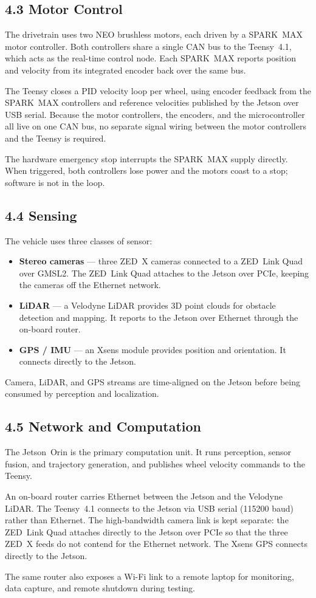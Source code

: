 \documentclass[11pt]{article}
\begin{document}
\subsection*{4.3 Motor Control}
The drivetrain uses two NEO brushless motors, each driven by a SPARK~MAX
motor controller. Both controllers share a single CAN bus to the Teensy~4.1,
which acts as the real-time control node. Each SPARK~MAX reports position
and velocity from its integrated encoder back over the same bus.

The Teensy closes a PID velocity loop per wheel, using encoder feedback from
the SPARK~MAX controllers and reference velocities published by the Jetson
over USB serial. Because the motor controllers, the encoders, and the
microcontroller all live on one CAN bus, no separate signal wiring between
the motor controllers and the Teensy is required.

The hardware emergency stop interrupts the SPARK~MAX supply directly. When
triggered, both controllers lose power and the motors coast to a stop;
software is not in the loop.

\subsection*{4.4 Sensing}
The vehicle uses three classes of sensor:

\begin{itemize}
  \item \textbf{Stereo cameras} — three ZED~X cameras connected to a ZED~Link
    Quad over GMSL2. The ZED~Link Quad attaches to the Jetson over PCIe,
    keeping the cameras off the Ethernet network.
  \item \textbf{LiDAR} — a Velodyne LiDAR provides 3D point clouds for
    obstacle detection and mapping. It reports to the Jetson over Ethernet
    through the on-board router.
  \item \textbf{GPS / IMU} — an Xsens module provides position and
    orientation. It connects directly to the Jetson.
\end{itemize}

Camera, LiDAR, and GPS streams are time-aligned on the Jetson before being
consumed by perception and localization.

\subsection*{4.5 Network and Computation}
The Jetson~Orin is the primary computation unit. It runs perception, sensor
fusion, and trajectory generation, and publishes wheel velocity commands to
the Teensy.

An on-board router carries Ethernet between the Jetson and the Velodyne LiDAR.
The Teensy~4.1 connects to the Jetson via USB serial (115200 baud) rather than
Ethernet. The high-bandwidth camera link is kept separate: the
ZED~Link Quad attaches directly to the Jetson over PCIe so that the three
ZED~X feeds do not contend for the Ethernet network. The Xsens GPS connects
directly to the Jetson.

The same router also exposes a Wi-Fi link to a remote laptop for monitoring,
data capture, and remote shutdown during testing.
\end{document}
